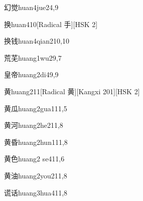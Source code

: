 \begin{entry}{幻觉}{huan4jue2}{4,9}
\end{entry}

\begin{entry}{换}{huan4}{10}[Radical 手][HSK 2]
\end{entry}

\begin{entry}{换钱}{huan4qian2}{10,10}
\end{entry}

\begin{entry}{荒芜}{huang1wu2}{9,7}
\end{entry}

\begin{entry}{皇帝}{huang2di4}{9,9}
\end{entry}

\begin{entry}{黄}{huang2}{11}[Radical ⻩][Kangxi 201][HSK 2]
\end{entry}

\begin{entry}{黄瓜}{huang2gua1}{11,5}
\end{entry}

\begin{entry}{黄河}{huang2he2}{11,8}
\end{entry}

\begin{entry}{黄昏}{huang2hun1}{11,8}
\end{entry}

\begin{entry}{黄色}{huang2 se4}{11,6}
\end{entry}

\begin{entry}{黄油}{huang2you2}{11,8}
\end{entry}

\begin{entry}{谎话}{huang3hua4}{11,8}
\end{entry}

